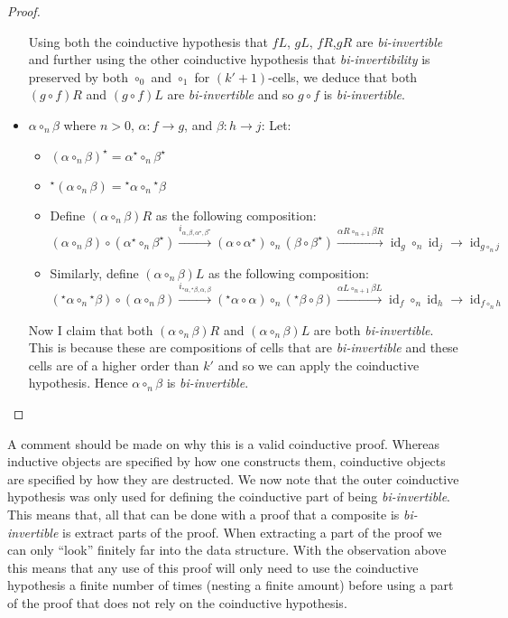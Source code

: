 \documentclass{article}
\theoremstyle{definition}
\theoremstyle{examplestyle}
\DeclareMathOperator{\id}{id}
\newcommand{\linv}[1]{{}^\star\!#1}
\newcommand{\rinv}[1]{#1^\star}
\begin{document}
\begin{proof}
\begin{itemize}
      Using both the coinductive hypothesis that \(fL\), \(gL\), \(fR\),\(gR\) are \emph{bi-invertible} and further using the other coinductive hypothesis that \emph{bi-invertibility} is preserved by both \(\circ_0\) and \(\circ_1\) for \((k'+1)\)-cells, we deduce that both \((g \circ f)R\) and \((g \circ f)L\) are \emph{bi-invertible} and so \(g \circ f\) is \emph{bi-invertible}.
    \item \(\alpha \circ_n \beta\) where \(n > 0\), \(\alpha: f \to g\), and \(\beta: h \to j\): Let:
      \begin{itemize}
      \item \(\rinv {(\alpha \circ_n \beta)} = \rinv \alpha \circ_n \rinv \beta\)
      \item \(\linv {(\alpha \circ_n \beta)} = \linv \alpha \circ_n \linv \beta\)
      \item Define \((\alpha \circ_n \beta)R\) as the following composition:
        \begin{equation*}
          (\alpha \circ_n \beta) \circ (\rinv \alpha \circ_n \rinv \beta) \overset {i_{\alpha,\beta,\rinv \alpha, \rinv \beta}} \to (\alpha \circ \rinv \alpha) \circ_n (\beta \circ \rinv \beta) \overset {\alpha R \circ_{n+1} \beta R} \to \id_g \circ_n \id_j \to \id_{g \circ_n j}
        \end{equation*}
      \item Similarly, define \((\alpha \circ_n \beta)L\) as the following composition:
        \begin{equation*}
          (\linv \alpha \circ_n \linv \beta) \circ (\alpha \circ_n \beta) \overset {i_{\linv \alpha, \linv \beta, \alpha, \beta}} \to (\linv \alpha \circ \alpha) \circ_n (\linv \beta \circ \beta) \overset {\alpha L \circ_{n+1} \beta L} \to \id_f \circ_n \id_h \to \id_{f \circ_n h}
        \end{equation*}
    \end{itemize}
    Now I claim that both \((\alpha \circ_n \beta)R\) and \((\alpha \circ_n \beta)L\) are both \emph{bi-invertible}. This is because these are compositions of cells that are \emph{bi-invertible} and these cells are of a higher order than \(k'\) and so we can apply the coinductive hypothesis. Hence \(\alpha \circ_n \beta\) is \emph{bi-invertible}.
  \end{itemize}
\end{proof}
A comment should be made on why this is a valid coinductive proof. Whereas inductive objects are specified by how one constructs them, coinductive objects are specified by how they are destructed. We now note that the outer coinductive hypothesis was only used for defining the coinductive part of being \emph{bi-invertible}. This means that, all that can be done with a proof that a composite is \emph{bi-invertible} is extract parts of the proof. When extracting a part of the proof we can only ``look'' finitely far into the data structure. With the observation above this means that any use of this proof will only need to use the coinductive hypothesis a finite number of times (nesting a finite amount) before using a part of the proof that does not rely on the coinductive hypothesis.
\end{document}
